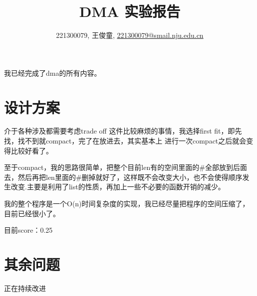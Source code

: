 \documentclass[a4paper,UTF8]{article}
\numberwithin{equation}{section}
\theoremstyle{definition}
\begin{document}
\title{DMA 实验报告}
\author{221300079, 王俊童, \href{mailto:221300079@smail.nju.edu.cn}{221300079@smail.nju.edu.cn}}
\maketitle

    我已经完成了dma的所有内容。

    \section{设计方案}

    介于各种涉及都需要考虑trade off 这件比较麻烦的事情，我选择first fit，即先找，找不到就compact，完了在放进去，其实基本上
    进行一次compact之后就会变得比较好看了。

    至于compact，我的思路很简单，把整个目前len有的空间里面的\#全部放到后面去，然后再把len里面的\#删掉就好了，这样既不会改变大小，也不会使得顺序发生改变.主要是利用了list的性质，再加上一些不必要的函数开销的减少。

    我的整个程序是一个O(n)时间复杂度的实现，我已经尽量把程序的空间压缩了，目前已经很小了。

    目前score：0.25
    \section{其余问题}

    正在持续改进
\end{document}
